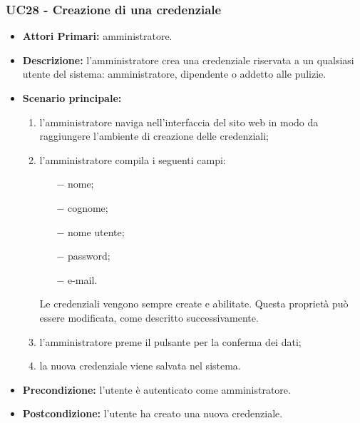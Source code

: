 \subsubsection{ UC28 - Creazione di una credenziale}
\begin{itemize}
	\item\textbf{Attori Primari:}
	amministratore.
	\item\textbf{Descrizione:} 
	l'amministratore crea una credenziale riservata a un qualsiasi utente del sistema: amministratore, dipendente o addetto alle pulizie.
	\item\textbf{Scenario principale:} 
	\begin{enumerate}
		\item l'amministratore naviga nell'interfaccia del sito web in modo da raggiungere l'ambiente di creazione delle credenziali;
		\item l'amministratore compila i seguenti campi:
		\begin{itemize}
			\item[$-$] nome;
			\item[$-$] cognome;
			\item[$-$] nome utente;
			\item[$-$] password;
			\item[$-$] e-mail.
		\end{itemize}
		Le credenziali vengono sempre create e abilitate. Questa proprietà può essere modificata, come descritto successivamente.
		\item l'amministratore preme il pulsante per la conferma dei dati;
		\item la nuova credenziale viene salvata nel sistema.
	\end{enumerate}
	\item\textbf{Precondizione:} 
	l'utente è autenticato come amministratore.
	\item\textbf{Postcondizione:}
	l'utente ha creato una nuova credenziale.
\end{itemize}

